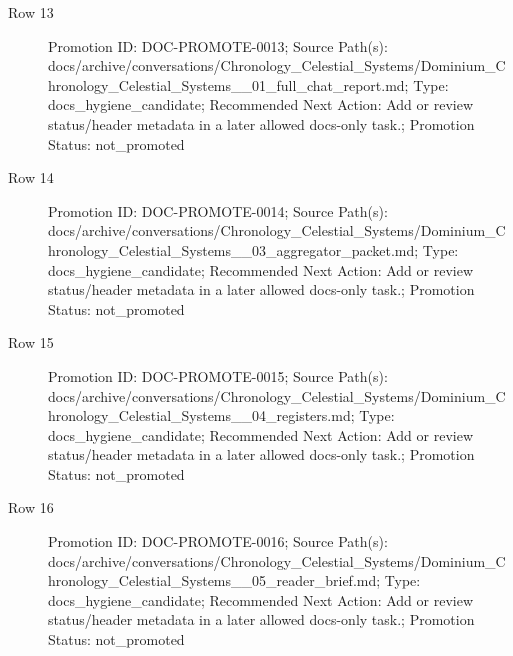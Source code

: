 \documentclass[9pt,a4paper,openany]{book}
\begin{document}
\begin{description}
\item[Row 13] Promotion ID: DOC-\allowbreak{}PROMOTE-\allowbreak{}0013; Source Path(s): docs/\allowbreak{}archive/\allowbreak{}conversations/\allowbreak{}Chronology\_\allowbreak{}Celestial\_\allowbreak{}Systems/\allowbreak{}Dominium\_\allowbreak{}Chronology\_\allowbreak{}Celestial\_\allowbreak{}Systems\_\allowbreak{}\_\allowbreak{}01\_\allowbreak{}full\_\allowbreak{}chat\_\allowbreak{}report.\allowbreak{}md; Type: docs\_\allowbreak{}hygiene\_\allowbreak{}candidate; Recommended Next Action: Add or review status/\allowbreak{}header metadata in a later allowed docs-\allowbreak{}only task.\allowbreak{}; Promotion Status: not\_\allowbreak{}promoted
\item[Row 14] Promotion ID: DOC-\allowbreak{}PROMOTE-\allowbreak{}0014; Source Path(s): docs/\allowbreak{}archive/\allowbreak{}conversations/\allowbreak{}Chronology\_\allowbreak{}Celestial\_\allowbreak{}Systems/\allowbreak{}Dominium\_\allowbreak{}Chronology\_\allowbreak{}Celestial\_\allowbreak{}Systems\_\allowbreak{}\_\allowbreak{}03\_\allowbreak{}aggregator\_\allowbreak{}packet.\allowbreak{}md; Type: docs\_\allowbreak{}hygiene\_\allowbreak{}candidate; Recommended Next Action: Add or review status/\allowbreak{}header metadata in a later allowed docs-\allowbreak{}only task.\allowbreak{}; Promotion Status: not\_\allowbreak{}promoted
\item[Row 15] Promotion ID: DOC-\allowbreak{}PROMOTE-\allowbreak{}0015; Source Path(s): docs/\allowbreak{}archive/\allowbreak{}conversations/\allowbreak{}Chronology\_\allowbreak{}Celestial\_\allowbreak{}Systems/\allowbreak{}Dominium\_\allowbreak{}Chronology\_\allowbreak{}Celestial\_\allowbreak{}Systems\_\allowbreak{}\_\allowbreak{}04\_\allowbreak{}registers.\allowbreak{}md; Type: docs\_\allowbreak{}hygiene\_\allowbreak{}candidate; Recommended Next Action: Add or review status/\allowbreak{}header metadata in a later allowed docs-\allowbreak{}only task.\allowbreak{}; Promotion Status: not\_\allowbreak{}promoted
\item[Row 16] Promotion ID: DOC-\allowbreak{}PROMOTE-\allowbreak{}0016; Source Path(s): docs/\allowbreak{}archive/\allowbreak{}conversations/\allowbreak{}Chronology\_\allowbreak{}Celestial\_\allowbreak{}Systems/\allowbreak{}Dominium\_\allowbreak{}Chronology\_\allowbreak{}Celestial\_\allowbreak{}Systems\_\allowbreak{}\_\allowbreak{}05\_\allowbreak{}reader\_\allowbreak{}brief.\allowbreak{}md; Type: docs\_\allowbreak{}hygiene\_\allowbreak{}candidate; Recommended Next Action: Add or review status/\allowbreak{}header metadata in a later allowed docs-\allowbreak{}only task.\allowbreak{}; Promotion Status: not\_\allowbreak{}promoted

\end{description}
\end{document}
